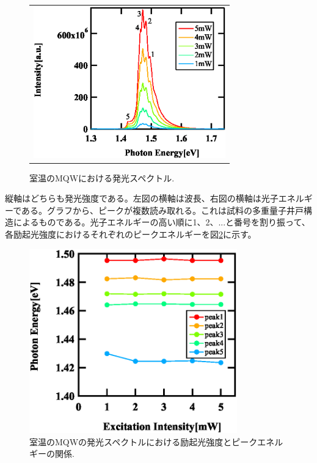 \documentclass[11pt,a4j]{jsarticle}
\begin{document}
\begin{enumerate}
\begin{figure}[ht]
\begin{tabular}{c}
         \begin{minipage}{0.5\hsize}
          \centering
          \includegraphics[clip,width=8.3cm]{start2_MQW_rt_Spectrum_eV.eps}
         \end{minipage}
        \end{tabular}
        \caption{室温のMQWにおける発光スペクトル.}
        \label{fig_mqw_rt_spec1}

       \end{figure}


       縦軸はどちらも発光強度である。左図の横軸は波長、右図の横軸は光子エネルギーである。グラフから、ピークが複数読み取れる。これは試料の多重量子井戸構造によるものである。光子エネルギーの高い順に1、2、...と番号を割り振って、各励起光強度におけるそれぞれのピークエネルギーを図\ref{fig_mqw_rt_peak1}に示す。

       \begin{figure}[ht]
        \centering
        \includegraphics[clip,width=9cm]{start2_MQW_rt_Peak.eps}
        \caption{室温のMQWの発光スペクトルにおける励起光強度とピークエネルギーの関係.}
        \label{fig_mqw_rt_peak1}
       \end{figure}



\end{enumerate}
\end{document}
